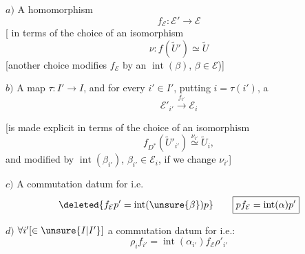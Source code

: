 $a)$ A homomorphism
\[
\boxed{\boxed{f_{\mathcal E}:\mathcal E'\longrightarrow\mathcal E}}
\]
[ in terms of the choice of an isomorphism
\[
\nu:f(\widetilde U')\simeq\widetilde U
\]
[another choice modifies $f_{\mathcal E}$ by an $\operatorname{int}(\beta)$, $\beta\in\mathcal E$)]

$b)$ A  map $\tau:I'\longrightarrow I$, and for every $i'\in I'$, putting $i=\tau(i')$, a 
\[
\boxed{\mathcal E'_{i'}\xrightarrow{f_{i'}}\mathcal E_i}
\]


[is made explicit in terms of the choice of an isomorphism
\[
f_{D^*}(\widetilde U'_{i'})\overset{\nu_{i'}}{\simeq}\widetilde U_i,
\]
and modified by $\operatorname{int}(\beta_{i'})$, $\beta_{i'}\in\mathcal E_i$, if we change $\nu_{i'}$]

$c)$ A commutation datum for
i.e.
\[
\deleted{f_{\mathcal E}p'=\operatorname{int}(\unsure{\beta})p}
\qquad\boxed{pf_{\mathcal E}=\operatorname{int}(\alpha)p'}
\]

$d)$ $\forall i'[\in\unsure{I|I'}]$ a commutation datum for
i.e.:
\[
\boxed{\rho_i f_{i'}=\operatorname{int}(\alpha_{i'})f_{\mathcal E}\rho'_{i'}}
\]

